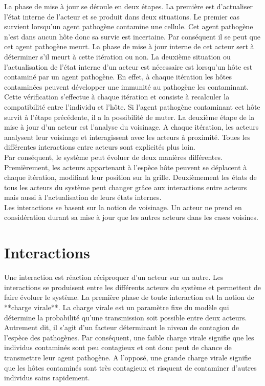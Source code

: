 La phase de mise à jour se déroule en deux étapes. La première est d'actualiser l'état interne de l'acteur et se produit dans deux situations. Le premier cas survient lorsqu'un agent pathogène contamine une cellule. Cet agent pathogène n'est dans aucun hôte donc sa survie est incertaine. Par conséquent il se peut que cet agent pathogène meurt. La phase de mise à jour interne de cet acteur sert à déterminer s'il meurt à cette itération ou non. La deuxième situation ou l'actualisation de l'état interne d'un acteur est nécessaire est lorsqu'un hôte est contaminé par un agent pathogène. En effet, à chaque itération les hôtes contaminées peuvent développer une immunité au pathogène les contaminant. Cette vérification s'effectue à chaque itération  et consiste à recalculer la compatibilité entre l'individu et l'hôte. Si l'agent pathogène contaminant cet hôte survit à l'étape précédente, il a la possibilité de muter. La deuxième étape de la mise à jour d'un acteur est l'analyse du voisinage. A chaque itération, les acteurs analysent leur voisinage et interagissent avec les acteurs à proximité. Toues les différentes interactions entre acteurs sont explicités plus loin.\\

Par conséquent, le système peut évoluer de deux manières différentes. Premièrement, les acteurs appartenant à l'espèce hôte peuvent se déplacent à chaque itération, modifiant leur position sur la grille. Deuxièmement les états de tous les acteurs du système peut changer grâce aux interactions entre acteurs mais aussi à l'actualisation de leurs états internes.\\

Les interactions se basent sur la notion de voisinage. Un acteur ne prend en considération durant sa mise à jour que les autres acteurs dans les cases voisines.

\section{Interactions}

Une interaction est réaction réciproquer d'un acteur sur un autre. Les interactions se produisent entre les différents acteurs du système et permettent de faire évoluer le système. La première phase de toute interaction est la notion de **charge virale**. La charge virale est un paramètre fixe du modèle qui détermine la probabilité qu'une transmission soit possible entre deux acteurs. Autrement dit, il s'agit d'un facteur déterminant le niveau de contagion de l'espèce des pathogènes. Par conséquent, une faible charge virale signifie que les individus contaminés sont peu contagieux et ont donc peut de chance de transmettre leur agent pathogène. A l'opposé, une grande charge virale signifie que les hôtes contaminés sont très contagieux et risquent de contaminer d'autres individus sains rapidement.\\

